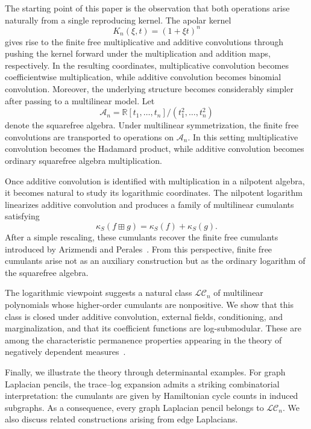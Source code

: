 \documentclass[11pt]{amsart}
\theoremstyle{definition}
\begin{document}
The starting point of this paper is the observation that both operations arise naturally from a single reproducing kernel.  The apolar kernel
\[
K_n(\xi,t)=(1+\xi t)^n
\]
gives rise to the finite free multiplicative and additive convolutions through pushing the kernel forward under the multiplication and addition maps, respectively.  In the resulting coordinates, multiplicative convolution becomes coefficientwise multiplication, while additive convolution becomes binomial convolution.
Moreover, the underlying structure becomes considerably simpler after
passing to a multilinear model.  Let
\[
\mathcal A_n= \mathbb R[t_1,\dots,t_n]/(t_1^2,\dots,t_n^2)
\]
denote the squarefree algebra.  Under multilinear symmetrization, the finite free convolutions are transported to operations on \(\mathcal A_n\).  In this setting multiplicative convolution becomes the Hadamard product, while additive convolution becomes ordinary squarefree algebra multiplication.

Once additive convolution is identified with multiplication in a nilpotent algebra, it becomes natural to study its logarithmic coordinates.  The nilpotent logarithm linearizes additive convolution and produces a family of multilinear cumulants satisfying
\[
    \kappa_S(f\boxplus g)
    =\kappa_S(f)+\kappa_S(g).
\]
After a simple rescaling, these cumulants recover the finite free
cumulants introduced by Arizmendi and Perales~\cite{AP18}.  From
this perspective, finite free cumulants arise not as an auxiliary
construction but as the ordinary logarithm of the squarefree algebra.

The logarithmic viewpoint suggests a natural class \(\mathcal{LC}_n\) of multilinear polynomials whose higher-order cumulants are nonpositive.  We show that this class is closed under additive convolution, external fields, conditioning, and marginalization, and that its coefficient functions are log-submodular.  These are among the characteristic permanence properties appearing in the theory of negatively dependent measures~\cite{Pem00,BBL09}.

Finally, we illustrate the theory through determinantal examples.  For graph Laplacian pencils, the trace--log expansion admits a striking combinatorial interpretation: the cumulants are given by Hamiltonian cycle counts in induced subgraphs.  As a consequence, every graph Laplacian pencil belongs to \(\mathcal{LC}_n\).  We also discuss related constructions arising from edge Laplacians.
\end{document}
